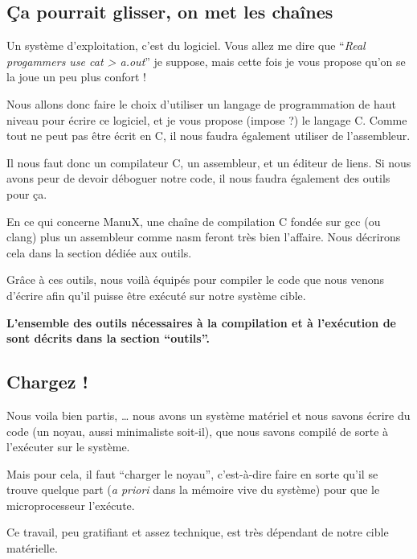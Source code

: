 %
\subsection{Ça pourrait glisser, on met les chaînes}

   Un système d'exploitation, c'est du logiciel. Vous allez me dire
que ``{\em Real progammers use cat > a.out}'' je suppose, mais cette
fois je vous propose qu'on se la joue un peu plus confort !

   Nous allons donc faire le choix d'utiliser un langage de
programmation de haut niveau pour écrire ce logiciel, et je vous
propose (impose ?) le langage C. Comme tout ne peut pas être écrit en
C, il nous faudra également utiliser de l'assembleur.

   Il nous faut donc un compilateur C, un assembleur, et un éditeur de
liens. Si nous avons peur de devoir déboguer notre code, il nous faudra
également des outils pour ça.

   En ce qui concerne ManuX, une chaîne de compilation C fondée sur gcc
(ou clang) plus un assembleur comme nasm feront très bien
   l'affaire. Nous décrirons cela dans la section dédiée aux outils.

   Grâce à ces outils, nous voilà équipés pour compiler le code que
nous venons d'écrire afin qu'il puisse être exécuté sur notre système
cible.

   {\bf
   L'ensemble des outils nécessaires à la compilation et à l'exécution
   de \manux sont décrits dans la section ``outils''.
   }
%
\subsection{Chargez !}

   Nous voila bien partis, \ldots{} nous avons un système matériel et
nous savons écrire du code (un noyau, aussi minimaliste soit-il), que
nous savons compilé de sorte à l'exécuter sur le système.

   Mais pour cela, il faut ``charger le noyau'', c'est-à-dire faire en
sorte qu'il se trouve quelque part ({\em a priori} dans la mémoire
vive du système) pour que le microprocesseur l'exécute.

   Ce travail, peu gratifiant et assez technique, est très dépendant
de notre cible matérielle.

